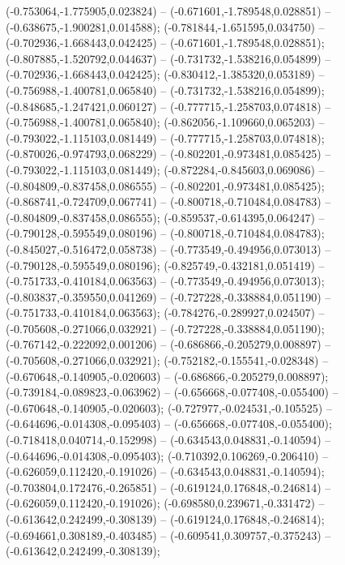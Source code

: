  (-0.753064,-1.775905,0.023824) -- (-0.671601,-1.789548,0.028851) -- (-0.638675,-1.900281,0.014588);
 (-0.781844,-1.651595,0.034750) -- (-0.702936,-1.668443,0.042425) -- (-0.671601,-1.789548,0.028851);
 (-0.807885,-1.520792,0.044637) -- (-0.731732,-1.538216,0.054899) -- (-0.702936,-1.668443,0.042425);
 (-0.830412,-1.385320,0.053189) -- (-0.756988,-1.400781,0.065840) -- (-0.731732,-1.538216,0.054899);
 (-0.848685,-1.247421,0.060127) -- (-0.777715,-1.258703,0.074818) -- (-0.756988,-1.400781,0.065840);
 (-0.862056,-1.109660,0.065203) -- (-0.793022,-1.115103,0.081449) -- (-0.777715,-1.258703,0.074818);
 (-0.870026,-0.974793,0.068229) -- (-0.802201,-0.973481,0.085425) -- (-0.793022,-1.115103,0.081449);
 (-0.872284,-0.845603,0.069086) -- (-0.804809,-0.837458,0.086555) -- (-0.802201,-0.973481,0.085425);
 (-0.868741,-0.724709,0.067741) -- (-0.800718,-0.710484,0.084783) -- (-0.804809,-0.837458,0.086555);
 (-0.859537,-0.614395,0.064247) -- (-0.790128,-0.595549,0.080196) -- (-0.800718,-0.710484,0.084783);
 (-0.845027,-0.516472,0.058738) -- (-0.773549,-0.494956,0.073013) -- (-0.790128,-0.595549,0.080196);
 (-0.825749,-0.432181,0.051419) -- (-0.751733,-0.410184,0.063563) -- (-0.773549,-0.494956,0.073013);
 (-0.803837,-0.359550,0.041269) -- (-0.727228,-0.338884,0.051190) -- (-0.751733,-0.410184,0.063563);
 (-0.784276,-0.289927,0.024507) -- (-0.705608,-0.271066,0.032921) -- (-0.727228,-0.338884,0.051190);
 (-0.767142,-0.222092,0.001206) -- (-0.686866,-0.205279,0.008897) -- (-0.705608,-0.271066,0.032921);
 (-0.752182,-0.155541,-0.028348) -- (-0.670648,-0.140905,-0.020603) -- (-0.686866,-0.205279,0.008897);
 (-0.739184,-0.089823,-0.063962) -- (-0.656668,-0.077408,-0.055400) -- (-0.670648,-0.140905,-0.020603);
 (-0.727977,-0.024531,-0.105525) -- (-0.644696,-0.014308,-0.095403) -- (-0.656668,-0.077408,-0.055400);
 (-0.718418,0.040714,-0.152998) -- (-0.634543,0.048831,-0.140594) -- (-0.644696,-0.014308,-0.095403);
 (-0.710392,0.106269,-0.206410) -- (-0.626059,0.112420,-0.191026) -- (-0.634543,0.048831,-0.140594);
 (-0.703804,0.172476,-0.265851) -- (-0.619124,0.176848,-0.246814) -- (-0.626059,0.112420,-0.191026);
 (-0.698580,0.239671,-0.331472) -- (-0.613642,0.242499,-0.308139) -- (-0.619124,0.176848,-0.246814);
 (-0.694661,0.308189,-0.403485) -- (-0.609541,0.309757,-0.375243) -- (-0.613642,0.242499,-0.308139);
